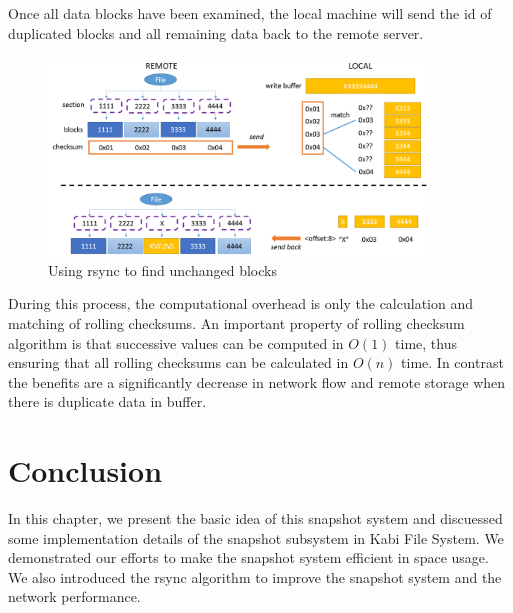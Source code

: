     Once all data blocks have been examined, the local machine will send the id of duplicated blocks and all remaining data back to the remote server.


\begin{figure}[hbtp]
\centering
\includegraphics[width=0.9\textwidth]{Chapter-4/figs/fig25.png}
\caption{Using rsync to find unchanged blocks}
\label{fig:rsync}
\end{figure}

    During this process, the computational overhead is only the calculation and matching of rolling checksums. An important property of rolling checksum algorithm is that successive values can be computed in $O(1)$ time, thus ensuring that all rolling checksums can be calculated in $O(n)$ time. In contrast the benefits are a significantly decrease in network flow and remote storage when there is duplicate data in buffer.

\section{Conclusion}

   In this chapter, we present the basic idea of this snapshot system and discuessed some implementation details of the snapshot subsystem in Kabi File System. We demonstrated our efforts to make the snapshot system efficient in space usage. We also introduced the rsync algorithm to improve the snapshot system and the network performance.
